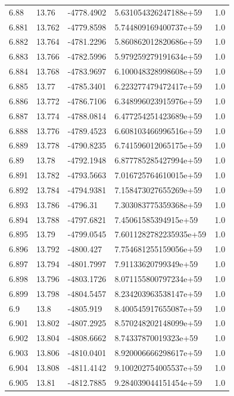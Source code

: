 \begin{tabular}{lllll}
6.88 & 13.76 & -4778.4902 & 5.631054326247188e+59 & 1.0 \\
6.881 & 13.762 & -4779.8598 & 5.744809169400737e+59 & 1.0 \\
6.882 & 13.764 & -4781.2296 & 5.860862012820686e+59 & 1.0 \\
6.883 & 13.766 & -4782.5996 & 5.979259279191634e+59 & 1.0 \\
6.884 & 13.768 & -4783.9697 & 6.100048328998608e+59 & 1.0 \\
6.885 & 13.77 & -4785.3401 & 6.223277479472417e+59 & 1.0 \\
6.886 & 13.772 & -4786.7106 & 6.348996023915976e+59 & 1.0 \\
6.887 & 13.774 & -4788.0814 & 6.477254251423689e+59 & 1.0 \\
6.888 & 13.776 & -4789.4523 & 6.608103466996516e+59 & 1.0 \\
6.889 & 13.778 & -4790.8235 & 6.741596012065175e+59 & 1.0 \\
6.89 & 13.78 & -4792.1948 & 6.877785285427994e+59 & 1.0 \\
6.891 & 13.782 & -4793.5663 & 7.016725764610015e+59 & 1.0 \\
6.892 & 13.784 & -4794.9381 & 7.158473027655269e+59 & 1.0 \\
6.893 & 13.786 & -4796.31 & 7.303083775359368e+59 & 1.0 \\
6.894 & 13.788 & -4797.6821 & 7.45061585394915e+59 & 1.0 \\
6.895 & 13.79 & -4799.0545 & 7.6011282782235935e+59 & 1.0 \\
6.896 & 13.792 & -4800.427 & 7.754681255159056e+59 & 1.0 \\
6.897 & 13.794 & -4801.7997 & 7.91133620799349e+59 & 1.0 \\
6.898 & 13.796 & -4803.1726 & 8.071155800797234e+59 & 1.0 \\
6.899 & 13.798 & -4804.5457 & 8.234203963538147e+59 & 1.0 \\
6.9 & 13.8 & -4805.919 & 8.400545917655087e+59 & 1.0 \\
6.901 & 13.802 & -4807.2925 & 8.570248202148099e+59 & 1.0 \\
6.902 & 13.804 & -4808.6662 & 8.74337870019323e+59 & 1.0 \\
6.903 & 13.806 & -4810.0401 & 8.920006666298617e+59 & 1.0 \\
6.904 & 13.808 & -4811.4142 & 9.100202754005537e+59 & 1.0 \\
6.905 & 13.81 & -4812.7885 & 9.284039044151454e+59 & 1.0 \\

\end{tabular}
